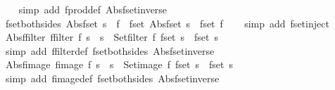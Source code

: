 \begin{isabellebody}
%
\isadelimproof
\ \ %
\endisadelimproof
%
\isatagproof
{}\isamarkupfalse%
\ {\isacharparenleft}simp\ add{\isacharcolon}\ fprod{\isacharunderscore}def\ Abs{\isacharunderscore}fset{\isacharunderscore}inverse{\isacharparenright}%
\endisatagproof
{\isafoldproof}%
%
\isadelimproof
\isanewline
%
\endisadelimproof
\isanewline
{}\isamarkupfalse%
\ fset{\isacharunderscore}both{\isacharunderscore}sides{\isacharcolon}\ {\isachardoublequoteopen}{\isacharparenleft}Abs{\isacharunderscore}fset\ s\ {\isacharequal}\ f{\isacharparenright}\ {\isacharequal}\ {\isacharparenleft}fset\ {\isacharparenleft}Abs{\isacharunderscore}fset\ s{\isacharparenright}\ {\isacharequal}\ fset\ f{\isacharparenright}{\isachardoublequoteclose}\isanewline
%
\isadelimproof
\ \ %
\endisadelimproof
%
\isatagproof
{}\isamarkupfalse%
\ {\isacharparenleft}simp\ add{\isacharcolon}\ fset{\isacharunderscore}inject{\isacharparenright}%
\endisatagproof
{\isafoldproof}%
%
\isadelimproof
\isanewline
%
\endisadelimproof
\isanewline
{}\isamarkupfalse%
\ Abs{\isacharunderscore}ffilter{\isacharcolon}\ {\isachardoublequoteopen}{\isacharparenleft}ffilter\ f\ s\ {\isacharequal}\ s{\isacharprime}{\isacharparenright}\ {\isacharequal}\ {\isacharparenleft}Set{\isachardot}filter\ f\ {\isacharparenleft}fset\ s{\isacharparenright}\ {\isacharequal}\ {\isacharparenleft}fset\ s{\isacharprime}{\isacharparenright}{\isacharparenright}{\isachardoublequoteclose}\isanewline
%
\isadelimproof
\ \ %
\endisadelimproof
%
\isatagproof
{}\isamarkupfalse%
\ {\isacharparenleft}simp\ add{\isacharcolon}\ ffilter{\isacharunderscore}def\ fset{\isacharunderscore}both{\isacharunderscore}sides\ Abs{\isacharunderscore}fset{\isacharunderscore}inverse{\isacharparenright}%
\endisatagproof
{\isafoldproof}%
%
\isadelimproof
\isanewline
%
\endisadelimproof
\isanewline
{}\isamarkupfalse%
\ Abs{\isacharunderscore}fimage{\isacharcolon}\ {\isachardoublequoteopen}{\isacharparenleft}fimage\ f\ s\ {\isacharequal}\ s{\isacharprime}{\isacharparenright}\ {\isacharequal}\ {\isacharparenleft}Set{\isachardot}image\ f\ {\isacharparenleft}fset\ s{\isacharparenright}\ {\isacharequal}\ {\isacharparenleft}fset\ s{\isacharprime}{\isacharparenright}{\isacharparenright}{\isachardoublequoteclose}\isanewline
%
\isadelimproof
\ \ %
\endisadelimproof
%
\isatagproof
{}\isamarkupfalse%
\ {\isacharparenleft}simp\ add{\isacharcolon}\ fimage{\isacharunderscore}def\ fset{\isacharunderscore}both{\isacharunderscore}sides\ Abs{\isacharunderscore}fset{\isacharunderscore}inverse{\isacharparenright}%

\end{isabellebody}
